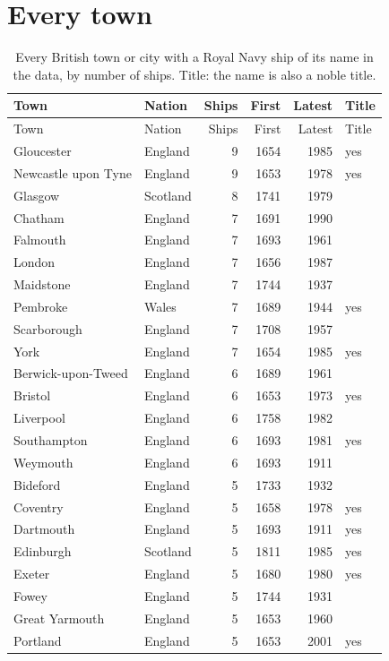 \documentclass[11pt,a4paper]{article}
\begin{document}
\section{Every town}
{\footnotesize\begin{longtable}{llrrrl}\caption{Every British town or city with a Royal Navy ship of its name in the data, by number of ships. Title: the name is also a noble title.}\\\toprule Town & Nation & Ships & First & Latest & Title\\\midrule\endfirsthead\toprule Town & Nation & Ships & First & Latest & Title\\\midrule\endhead
Gloucester & England & 9 & 1654 & 1985 & yes\\
Newcastle upon Tyne & England & 9 & 1653 & 1978 & yes\\
Glasgow & Scotland & 8 & 1741 & 1979 & \\
Chatham & England & 7 & 1691 & 1990 & \\
Falmouth & England & 7 & 1693 & 1961 & \\
London & England & 7 & 1656 & 1987 & \\
Maidstone & England & 7 & 1744 & 1937 & \\
Pembroke & Wales & 7 & 1689 & 1944 & yes\\
Scarborough & England & 7 & 1708 & 1957 & \\
York & England & 7 & 1654 & 1985 & yes\\
Berwick-upon-Tweed & England & 6 & 1689 & 1961 & \\
Bristol & England & 6 & 1653 & 1973 & yes\\
Liverpool & England & 6 & 1758 & 1982 & \\
Southampton & England & 6 & 1693 & 1981 & yes\\
Weymouth & England & 6 & 1693 & 1911 & \\
Bideford & England & 5 & 1733 & 1932 & \\
Coventry & England & 5 & 1658 & 1978 & yes\\
Dartmouth & England & 5 & 1693 & 1911 & yes\\
Edinburgh & Scotland & 5 & 1811 & 1985 & yes\\
Exeter & England & 5 & 1680 & 1980 & yes\\
Fowey & England & 5 & 1744 & 1931 & \\
Great Yarmouth & England & 5 & 1653 & 1960 & \\
Portland & England & 5 & 1653 & 2001 & yes\\

\end{longtable}}
\end{document}
